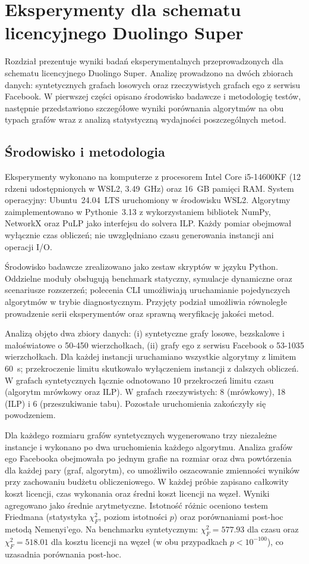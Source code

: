 \chapter{Eksperymenty dla schematu licencyjnego Duolingo Super}
\label{chap:experiments}

Rozdział prezentuje wyniki badań eksperymentalnych przeprowadzonych dla schematu licencyjnego Duolingo Super. Analizę prowadzono na dwóch zbiorach danych: syntetycznych grafach losowych oraz rzeczywistych grafach ego z serwisu Facebook. W pierwszej części opisano środowisko badawcze i metodologię testów, następnie przedstawiono szczegółowe wyniki porównania algorytmów na obu typach grafów wraz z analizą statystyczną wydajności poszczególnych metod.

\section{Środowisko i metodologia}

Eksperymenty wykonano na komputerze z procesorem Intel Core i5-14600KF (12 rdzeni udostępnionych w WSL2, 3.49~GHz) oraz 16~GB pamięci RAM. System operacyjny: Ubuntu~24.04~LTS uruchomiony w środowisku WSL2. Algorytmy zaimplementowano w Pythonie~3.13 z wykorzystaniem bibliotek NumPy, NetworkX oraz PuLP jako interfejsu do solvera ILP. Każdy pomiar obejmował wyłącznie czas obliczeń; nie uwzględniano czasu generowania instancji ani operacji I/O.

Środowisko badawcze zrealizowano jako zestaw skryptów w języku Python. Oddzielne moduły obsługują benchmark statyczny, symulacje dynamiczne oraz scenariusze rozszerzeń; polecenia CLI umożliwiają uruchamianie pojedynczych algorytmów w trybie diagnostycznym. Przyjęty podział umożliwia równoległe prowadzenie serii eksperymentów oraz sprawną weryfikację jakości metod.

Analizą objęto dwa zbiory danych: (i) syntetyczne grafy losowe, bezskalowe i małoświatowe o 50-450 wierzchołkach, (ii) grafy ego z serwisu Facebook o 53-1035 wierzchołkach. Dla każdej instancji uruchamiano wszystkie algorytmy z limitem 60~s; przekroczenie limitu skutkowało wyłączeniem instancji z dalszych obliczeń. W grafach syntetycznych łącznie odnotowano 10 przekroczeń limitu czasu (algorytm mrówkowy oraz ILP). W grafach rzeczywistych: 8 (mrówkowy), 18 (ILP) i 6 (przeszukiwanie tabu). Pozostałe uruchomienia zakończyły się powodzeniem.

Dla każdego rozmiaru grafów syntetycznych wygenerowano trzy niezależne instancje i wykonano po dwa uruchomienia każdego algorytmu. Analiza grafów ego Facebooka obejmowała po jednym grafie na rozmiar oraz dwa powtórzenia dla każdej pary (graf, algorytm), co umożliwiło oszacowanie zmienności wyników przy zachowaniu budżetu obliczeniowego. W każdej próbie zapisano całkowity koszt licencji, czas wykonania oraz średni koszt licencji na węzeł. Wyniki agregowano jako średnie arytmetyczne. Istotność różnic oceniono testem Friedmana (statystyka $\chi^2_F$, poziom istotności $p$) oraz porównaniami post-hoc metodą Nemenyi’ego. Na benchmarku syntetycznym: $\chi^2_F=577.93$ dla czasu oraz $\chi^2_F=518.01$ dla kosztu licencji na węzeł (w obu przypadkach $p<10^{-100}$), co uzasadnia porównania post-hoc.

